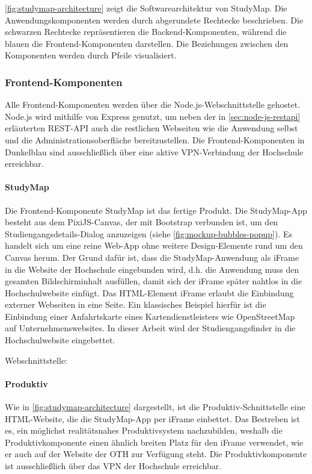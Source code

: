 \autoref{fig:studymap-architecture} zeigt die Softwarearchitektur von StudyMap. Die Anwendungskomponenten werden durch abgerundete Rechtecke beschrieben. Die schwarzen Rechtecke repräsentieren die Backend-Komponenten, während die blauen die Frontend-Komponenten darstellen. Die Beziehungen zwischen den Komponenten werden durch Pfeile visualisiert.

\subsubsection{Frontend-Komponenten}\label{sec:frontend-komponenten}
Alle Frontend-Komponenten werden über die Node.js-Webschnittstelle gehostet. Node.js wird mithilfe von Express genutzt, um neben der in \autoref{sec:node-js-restapi} erläuterten REST-API auch die restlichen Webseiten wie die Anwendung selbst und die Administrationsoberfläche bereitzustellen. Die Frontend-Komponenten in Dunkelblau sind ausschließlich über eine aktive VPN-Verbindung der Hochschule erreichbar.

\paragraph*{StudyMap}
Die Frontend-Komponente StudyMap ist das fertige Produkt. Die StudyMap-App besteht aus dem PixiJS-Canvas, der mit Bootstrap verbunden ist, um den Studiengangsdetails-Dialog anzuzeigen (siehe \autoref{fig:mockup-bubbles-popup}). Es handelt sich um eine reine Web-App ohne weitere Design-Elemente rund um den Canvas herum. Der Grund dafür ist, dass die StudyMap-Anwendung als iFrame in die Website der Hochschule eingebunden wird, d.h. die Anwendung muss den gesamten Bildschirminhalt ausfüllen, damit sich der iFrame später nahtlos in die Hochschulwebsite einfügt. Das HTML-Element iFrame erlaubt die Einbindung externer Webseiten in eine Seite. Ein klassisches Beispiel hierfür ist die Einbindung einer Anfahrtskarte eines Kartendienstleisters wie OpenStreetMap auf Unternehmenswebsites. \parencite{mozilla_corporation_iframe_2024} In dieser Arbeit wird der Studiengangsfinder in die Hochschulwebsite eingebettet.

\noindent
Webschnittstelle: 

\paragraph*{Produktiv}
Wie in \autoref{fig:studymap-architecture} dargestellt, ist die Produktiv-Schnittstelle eine HTML-Website, die die StudyMap-App per iFrame einbettet.  Das Bestreben ist es, ein möglichst realitätsnahes Produktivsystem nachzubilden, weshalb die Produktivkomponente einen ähnlich breiten Platz für den iFrame verwendet, wie er auch auf der Website der OTH zur Verfügung steht. Die Produktivkomponente ist ausschließlich über das VPN der Hochschule erreichbar.

